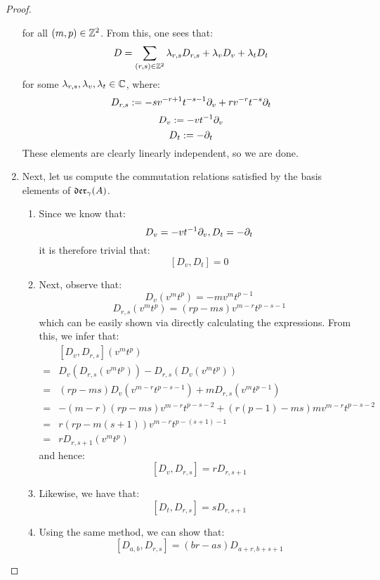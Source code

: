 \begin{proof}
\begin{enumerate}
$$                        $$
                    for all $(m, p) \in \mathbb{Z}^2$. From this, one sees that:
                        $$D = \sum_{(r, s) \in \mathbb{Z}^2} \lambda_{r, s} D_{r, s} + \lambda_v D_v + \lambda_t D_t$$
                    for some $\lambda_{r, s}, \lambda_v, \lambda_t \in \mathbb{C}$, where:
                        $$D_{r, s} := -s v^{-r + 1} t^{-s - 1} \partial_v + r v^{-r} t^{-s} \partial_t$$
                        $$D_v := -v t^{-1} \partial_v$$
                        $$D_t := -\partial_t$$
                    These elements are clearly linearly independent, so we are done.
                    \item Next, let us compute the commutation relations satisfied by the basis elements of $\mathfrak{der}_{\gamma}(A)$.
                    \begin{enumerate}
                        \item Since we know that:
                            $$D_v = -vt^{-1} \partial_v, D_t = -\partial_t$$
                        it is therefore trivial that:
                            $$[D_v, D_t] = 0$$
                        \item Next, observe that:
                            $$D_v(v^m t^p) = -m v^m t^{p - 1}$$
                            $$D_{r, s}(v^m t^p) = ( rp - ms ) v^{m - r} t^{p - s - 1}$$
                        which can be easily shown via directly calculating the expressions. From this, we infer that:
                            $$
                                \begin{aligned}
                                    & [D_v, D_{r, s}](v^m t^p)
                                    \\
                                    = & D_v( D_{r, s}(v^m t^p) ) - D_{r, s}( D_v(v^m t^p) )
                                    \\
                                    = & (rp - ms) D_v( v^{m - r} t^{p - s - 1} ) + m D_{r, s}( v^m t^{p - 1} )
                                    \\
                                    = & -(m - r)(rp - ms) v^{m - r} t^{p - s - 2} + (r(p - 1) - ms) m v^{m - r} t^{p - s - 2}
                                    \\
                                    = & r(rp - m(s + 1)) v^{m - r} t^{p - (s + 1) - 1}
                                    \\
                                    = & r D_{r, s + 1}(v^m t^p)
                                \end{aligned}
                            $$
                        and hence:
                            $$[D_v, D_{r, s}] = r D_{r, s + 1}$$
                        \item Likewise, we have that:
                            $$[D_t, D_{r, s}] = s D_{r, s + 1}$$
                        \item Using the same method, we can show that:
                            $$[D_{a, b}, D_{r, s}] = (br - as) D_{a + r, b + s + 1}$$
                    \end{enumerate}
                \end{enumerate}
            \end{proof}
